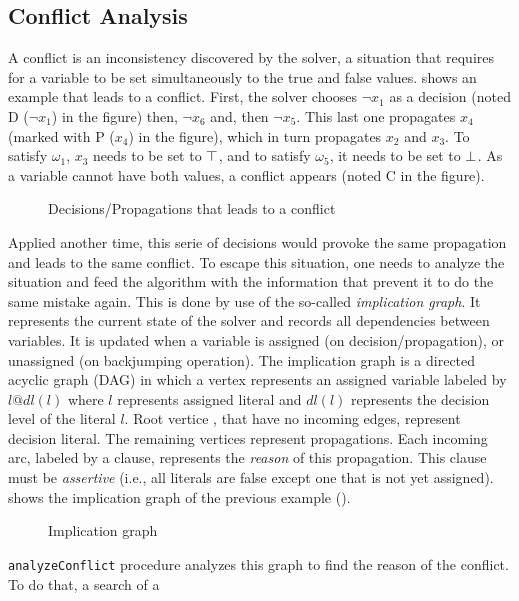 \subsection{Conflict Analysis}
A conflict is an inconsistency discovered by the solver, a situation that requires for a variable to be set 
simultaneously to the true and false values.  shows an example that leads to a conflict.
First, the solver chooses $\neg x_1$ as a decision (noted D ($\neg x_1$) in the figure) then, $\neg x_6$ and, then $\neg x_5$. This last one propagates $x_4$ (marked with P ($x_4$) in the figure),
which in turn propagates $x_2$ and $x_3$.
To satisfy $\omega_1$, $x_3$ needs to be set to $\top$, and  to satisfy $\omega_5$, 
it needs to be set to $\bot$. As a variable cannot have both values, a conflict appears (noted C in the figure).
\begin{figure}[!htbp]
 \centering
  
 \caption{Decisions/Propagations that leads to a  conflict}
 \label{fig:conflict}
\end{figure}
Applied another time, this serie of decisions would provoke the same propagation and leads to the same conflict. 
To escape this situation, one needs to analyze the situation and feed the algorithm with the information that prevent it to do the 
same mistake again. This is done by use of the so-called \emph{implication graph}.
It represents the current state of the solver and records all dependencies between  variables. It is updated when a variable is assigned 
(on decision/propagation), or unassigned (on backjumping operation). The implication graph is a directed acyclic graph (DAG) in which a vertex represents an assigned variable labeled by $l@dl(l)$ where $l$ represents assigned literal and $dl(l)$ represents the decision level of the literal $l$.
Root vertice , that have no incoming edges, represent decision literal. The remaining vertices represent
propagations.
Each incoming arc, labeled by a clause, represents the \emph{reason} of this propagation.
This clause must be \textit{assertive} (i.e., all  literals are false except one that is not yet assigned).
 shows the implication graph of the previous example ().
\begin{figure}[!htbp]
 \centering
 
 \caption{Implication graph}
 \label{fig:implication-graph}
\end{figure}
\texttt{analyzeConflict} procedure analyzes this graph to find the reason of the conflict. To do that, a search of a
